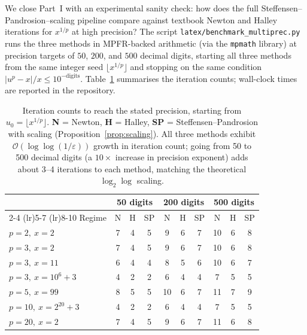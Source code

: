 \documentclass[11pt,a4paper]{article}
\theoremstyle{definition}
\begin{document}
We close Part~I with an experimental sanity check: how does the full Steffensen--Pandrosion--scaling pipeline compare against textbook Newton and Halley iterations for $x^{1/p}$ at high precision? The script \texttt{latex/benchmark\_multiprec.py} runs the three methods in MPFR-backed arithmetic (via the \texttt{mpmath} library) at precision targets of $50$, $200$, and $500$ decimal digits, starting all three methods from the same integer seed $\lfloor x^{1/p} \rfloor$ and stopping on the same condition $|u^p - x|/x \leq 10^{-\text{digits}}$. Table~\ref{tab:benchmark} summarises the iteration counts; wall-clock times are reported in the repository.

\begin{table}[H]
\centering
\small
\renewcommand{\arraystretch}{1.15}
\begin{tabular}{@{}lccccccccc@{}}
\toprule
& \multicolumn{3}{c}{\textbf{50 digits}} & \multicolumn{3}{c}{\textbf{200 digits}} & \multicolumn{3}{c}{\textbf{500 digits}} \\
\cmidrule(lr){2-4} \cmidrule(lr){5-7} \cmidrule(lr){8-10}
Regime & N & H & SP & N & H & SP & N & H & SP \\
\midrule
$p=2,\ x=2$             & 7 & 4 & 5 & 9  & 6 & 7 & 10 & 6 & 8 \\
$p=3,\ x=2$             & 7 & 4 & 5 & 9  & 6 & 7 & 10 & 6 & 8 \\
$p=3,\ x=11$            & 6 & 4 & 4 & 8  & 5 & 6 & 10 & 6 & 7 \\
$p=3,\ x=10^6+3$        & 4 & 2 & 2 & 6  & 4 & 4 & 7  & 5 & 5 \\
$p=5,\ x=99$            & 8 & 5 & 5 & 10 & 6 & 7 & 11 & 7 & 9 \\
$p=10,\ x=2^{20}+3$     & 4 & 2 & 2 & 6  & 4 & 4 & 7  & 5 & 5 \\
$p=20,\ x=2$            & 7 & 4 & 5 & 9  & 6 & 7 & 11 & 6 & 8 \\
\bottomrule
\end{tabular}
\caption{Iteration counts to reach the stated precision, starting from $u_0 = \lfloor x^{1/p} \rfloor$. \textbf{N} = Newton, \textbf{H} = Halley, \textbf{SP} = Steffensen--Pandrosion with scaling (Proposition~\ref{prop:scaling}). All three methods exhibit $\mathcal{O}(\log\log(1/\varepsilon))$ growth in iteration count; going from 50 to 500 decimal digits (a $10\times$ increase in precision exponent) adds about 3--4 iterations to each method, matching the theoretical $\log_2\log$ scaling.}
\label{tab:benchmark}
\end{table}
\end{document}
